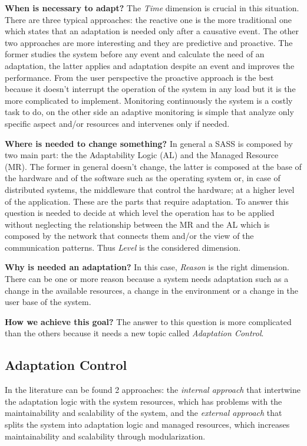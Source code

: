 \textbf{When is necessary to adapt?} The \emph{Time} dimension is crucial in this situation. There are three typical approaches: the reactive one is the more traditional one which states that an adaptation is needed only after a causative event. The other two approaches are more interesting and they are predictive and proactive. The former studies the system before any event and calculate the need of an adaptation, the latter applies and adaptation despite an event and improves the performance. From the user perspective the proactive approach is the best because it doesn't interrupt the operation of the system in any load but it is the more complicated to implement. Monitoring continuously the system is a costly task to do, on the other side an adaptive monitoring is simple that analyze only specific aspect and/or resources and intervenes only if needed.

\textbf{Where is needed to change something?} In general a SASS is composed by two main part: the the Adaptability Logic (AL) and the Managed Resource (MR). The former in general doesn't change, the latter is composed at the base of the hardware and of the software such as the operating system or, in case of distributed systems, the middleware that control the hardware; at a higher level of the application. These are the parts that require adaptation. To answer this question is needed to decide at which level the operation has to be applied without neglecting the relationship between the MR and the AL which is composed by the network that connects them and/or the view of the communication patterns. Thus \emph{Level} is the considered dimension.

\textbf{Why is needed an adaptation?} In this case, \emph{Reason} is the right dimension. There can be one or more reason because a system needs adaptation such as a change in the available resources, a change in the environment or a change in the user base of the system.

\textbf{How we achieve this goal?} The answer to this question is more complicated than the others because it needs a new topic called \emph{Adaptation Control}.

\subsection{Adaptation Control}
In the literature can be found 2 approaches: the \emph{internal approach} that intertwine the adaptation logic with the system resources, which has problems with the maintainability and scalability of the system, and the \emph{external approach} that splits the system into adaptation logic and managed resources, which increases maintainability and scalability through modularization.

